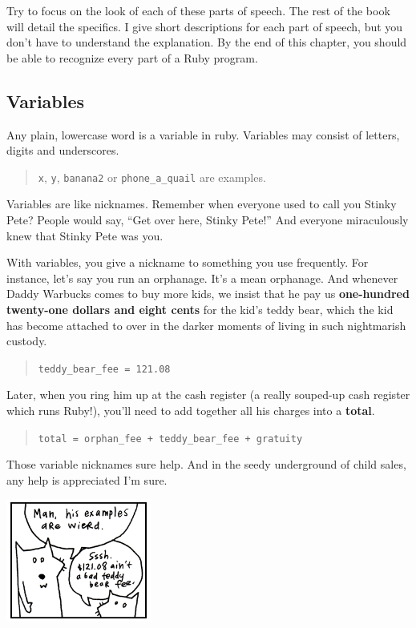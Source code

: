 \documentclass[10pt,twoside]{report}
\begin{document}
Try to focus on the look of each of these parts of speech.  The rest
of the book will detail the specifics.  I give short descriptions for
each part of speech, but you don't have to understand the explanation.
By the end of this chapter, you should be able to recognize every part
of a Ruby program.



\subsection{Variables}



Any plain, lowercase word is a variable in ruby.  Variables may
consist of letters, digits and underscores.

\begin{quote}
\lstinline[breaklines=true]|x|, \lstinline[breaklines=true]|y|,
\lstinline[breaklines=true]|banana2| or
\lstinline[breaklines=true]|phone_a_quail| are examples.\end{quote}


Variables are like nicknames.  Remember when everyone used to call you
Stinky Pete? People would say, ``Get over here, Stinky Pete!''  And
everyone miraculously knew that Stinky Pete was you.

With variables, you give a nickname to something you use frequently.
For instance, let's say you run an orphanage.  It's a mean orphanage.
And whenever Daddy Warbucks comes to buy more kids, we insist that he
pay us {\bf one-hundred twenty-one dollars and eight cents} for the
kid's teddy bear, which the kid has become attached to over in the
darker moments of living in such nightmarish custody.

\begin{quote}
\lstinline[breaklines=true]|teddy_bear_fee = 121.08|\end{quote}


Later, when you ring him up at the cash register (a really souped-up
cash register which runs Ruby!), you'll need to add together all his
charges into a {\bf total}.

\begin{quote}
\lstinline[breaklines=true]|total = orphan_fee + teddy_bear_fee + gratuity|\end{quote}

Those variable nicknames sure help.  And in the seedy underground of
child sales, any help is appreciated I'm sure.

	\includegraphics[width=0.3575\textwidth]{cache/8.png}
\end{document}
